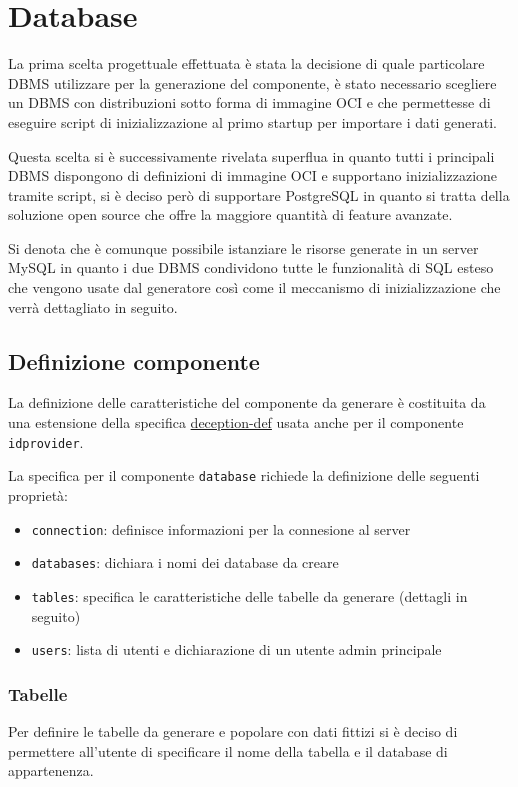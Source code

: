 \section{Database}

La prima scelta progettuale effettuata è stata la decisione di quale particolare DBMS utilizzare per la generazione del componente, è stato necessario scegliere un DBMS con distribuzioni sotto forma di immagine OCI e che permettesse di eseguire script di inizializzazione al primo startup per importare i dati generati.

Questa scelta si è successivamente rivelata superflua in quanto tutti i principali DBMS dispongono di definizioni di immagine OCI e supportano inizializzazione tramite script, si è deciso però di supportare PostgreSQL in quanto si tratta della soluzione open source che offre la maggiore quantità di feature avanzate.

Si denota che è comunque possibile istanziare le risorse generate in un server MySQL in quanto i due DBMS condividono tutte le funzionalità di SQL esteso che vengono usate dal generatore così come il meccanismo di inizializzazione che verrà dettagliato in seguito.

\subsection{Definizione componente}
La definizione delle caratteristiche del componente da generare è costituita da una estensione della specifica \underline{deception-def} usata anche per il componente \texttt{idprovider}.

La specifica per il componente \texttt{database} richiede la definizione delle seguenti proprietà:
\begin{itemize}
    \item \texttt{connection}: definisce informazioni per la connesione al server
    \item \texttt{databases}: dichiara i nomi dei database da creare
    \item \texttt{tables}: specifica le caratteristiche delle tabelle da generare (dettagli in seguito)
    \item \texttt{users}: lista di utenti e dichiarazione di un utente admin principale
\end{itemize}

\subsubsection{Tabelle}
Per definire le tabelle da generare e popolare con dati fittizi si è deciso di permettere all'utente di specificare il nome della tabella e il database di appartenenza.


